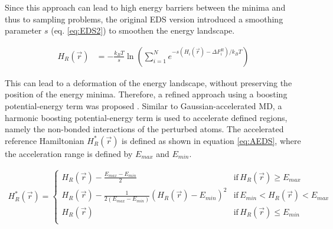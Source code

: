 Since this approach can lead to high energy barriers between the minima and thus to sampling problems, the original EDS version introduced a smoothing parameter $s$ (eq. \ref{eq:EDS2}) to smoothen the energy landscape. 

\begin{equation}
\begin{aligned}
H_R(\vec{r}) & = -\frac{k_BT}{s} \ln  \left( \sum_{i=1}^{N} e^{ -s(H_i(\vec{r}) - \Delta F_{i}^R)/k_BT} \right) 
\end{aligned}
\label{eq:EDS2}
\end{equation}

This can lead to a deformation of the energy landscape, without preserving the position of the energy minima. Therefore, a refined approach using a boosting potential-energy term was proposed \cite{JP2018,JP2020}. Similar to Gaussian-accelerated MD, a harmonic boosting potential-energy term is used to accelerate defined regions, namely the non-bonded interactions of the perturbed atoms. The accelerated reference Hamiltonian $H_R^{\ast}(\vec{r})$ is defined as shown in equation \ref{eq:AEDS}, where the acceleration range is defined by $E_{max}$ and $E_{min}$. 

\begin{equation}
  \begin{aligned}
H_R^{\ast}(\vec{r}) =\begin{cases}
        H_R(\vec{r}) - \frac{E_{max} - E_{min}}{2} &\text{if} \, H_R(\vec{r}) \geq E_{max} \\

        H_R(\vec{r}) - \frac{1}{2(E_{max} - E_{min})}(H_R(\vec{r}) -  E_{min})^2 &\text{if} \,  E_{min} < H_R(\vec{r}) < E_{max} \\

        H_R(\vec{r}) &\text{if} \, H_R(\vec{r}) \leq E_{min} \\
     \end{cases}
  \end{aligned}
  \label{eq:AEDS}
\end{equation}

